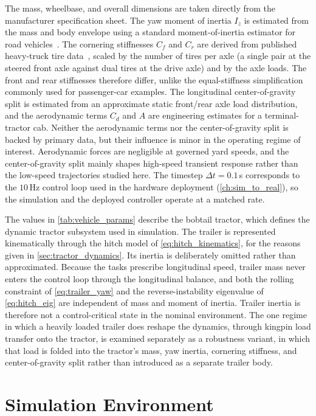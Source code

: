 The mass, wheelbase, and overall dimensions are taken directly from the manufacturer specification sheet. The yaw moment of inertia $I_z$ is estimated from the mass and body envelope using a standard moment-of-inertia estimator for road vehicles~\cite{macinnis1997inertia}. The cornering stiffnesses $C_f$ and $C_r$ are derived from published heavy-truck tire data~\cite{ervin1976tire}, scaled by the number of tires per axle (a single pair at the steered front axle against dual tires at the drive axle) and by the axle loads. The front and rear stiffnesses therefore differ, unlike the equal-stiffness simplification commonly used for passenger-car examples. The longitudinal center-of-gravity split is estimated from an approximate static front/rear axle load distribution, and the aerodynamic terms $C_d$ and $A$ are engineering estimates for a terminal-tractor cab. Neither the aerodynamic terms nor the center-of-gravity split is backed by primary data, but their influence is minor in the operating regime of interest. Aerodynamic forces are negligible at governed yard speeds, and the center-of-gravity split mainly shapes high-speed transient response rather than the low-speed trajectories studied here. The timestep $\Delta t = 0.1$\,s corresponds to the $10$\,Hz control loop used in the hardware deployment (\cref{ch:sim_to_real}), so the simulation and the deployed controller operate at a matched rate.

The values in \cref{tab:vehicle_params} describe the bobtail tractor, which defines the dynamic tractor subsystem used in simulation. The trailer is represented kinematically through the hitch model of \cref{eq:hitch_kinematics}, for the reasons given in \cref{sec:tractor_dynamics}. Its inertia is deliberately omitted rather than approximated. Because the tasks prescribe longitudinal speed, trailer mass never enters the control loop through the longitudinal balance, and both the rolling constraint of \cref{eq:trailer_yaw} and the reverse-instability eigenvalue of \cref{eq:hitch_eig} are independent of mass and moment of inertia. Trailer inertia is therefore not a control-critical state in the nominal environment. The one regime in which a heavily loaded trailer does reshape the dynamics, through kingpin load transfer onto the tractor, is examined separately as a robustness variant, in which that load is folded into the tractor's mass, yaw inertia, cornering stiffness, and center-of-gravity split rather than introduced as a separate trailer body.

\section{Simulation Environment}
\label{ch:simulation}

